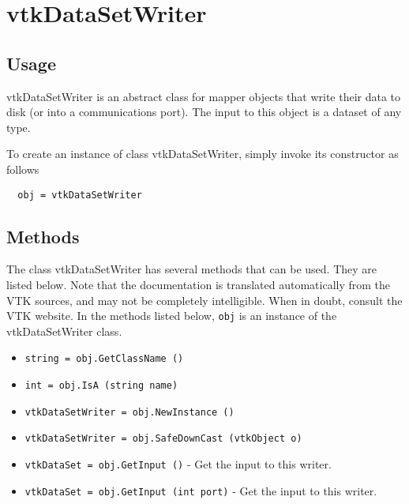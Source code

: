 \section{vtkDataSetWriter}

\subsection{Usage}

 vtkDataSetWriter is an abstract class for mapper objects that write their 
 data to disk (or into a communications port). The input to this object is
 a dataset of any type.

To create an instance of class vtkDataSetWriter, simply
invoke its constructor as follows
\begin{verbatim}
  obj = vtkDataSetWriter
\end{verbatim}
\subsection{Methods}

The class vtkDataSetWriter has several methods that can be used.
  They are listed below.
Note that the documentation is translated automatically from the VTK sources,
and may not be completely intelligible.  When in doubt, consult the VTK website.
In the methods listed below, \verb|obj| is an instance of the vtkDataSetWriter class.
\begin{itemize}
\item  \verb|string = obj.GetClassName ()|

\item  \verb|int = obj.IsA (string name)|

\item  \verb|vtkDataSetWriter = obj.NewInstance ()|

\item  \verb|vtkDataSetWriter = obj.SafeDownCast (vtkObject o)|

\item  \verb|vtkDataSet = obj.GetInput ()| -  Get the input to this writer.

\item  \verb|vtkDataSet = obj.GetInput (int port)| -  Get the input to this writer.

\end{itemize}
